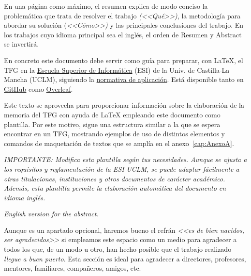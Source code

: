\pagestyle{plain}	%

\begin{resumenPral}[spanish]
En una página como máximo, el resumen explica de modo conciso la problemática que trata de resolver el trabajo \emph{(<<Qué>>)}, la metodología para  abordar su solución (\emph{<<Cómo>>)} y las principales conclusiones del trabajo. En los trabajos cuyo idioma principal sea el inglés, el orden de \textsf{Resumen} y \textsf{Abstract} se invertirá. 

En concreto este documento debe servir como guía para preparar, con \LaTeX, el TFG en la \href{http://webpub.esi.uclm.es/}{Escuela Superior de Informática} (ESI) de la Univ. de Castilla-La Mancha (UCLM), siguiendo la \href{https://esi.uclm.es/index.php/grado-en-ingenieria-informatica/trabajos-fin-de-grado/}{normativa de aplicación}. Está disponible tanto en \href{https://github.com/JesusSalido/TFG_ESI_UCLM}{GitHub} como \href{https://www.overleaf.com/latex/templates/plantilla-de-tfg-escuela-superior-de-informatica-uclm/phjgscmfqtsw}{Overleaf}.

Este texto se aprovecha para proporcionar información sobre la elaboración de la memoria del TFG con ayuda de \LaTeX{} empleando este documento como plantilla. Por este motivo, sigue una estructura similar a la que se espera encontrar en un TFG, mostrando ejemplos de uso de distintos elementos y comandos de maquetación de textos que se amplía en el anexo~\ref{cap:AnexoA}.

\noindent\emph{IMPORTANTE: Modifica esta plantilla según tus necesidades. Aunque se ajusta a los requisitos y reglamentación de la ESI-UCLM, se puede adaptar fácilmente a otras titulaciones, instituciones y otros documentos de carácter académico. Además, esta plantilla permite la elaboración automática del documento en idioma inglés.}
\end{resumenPral}


\begin{resumenAlt}[english]
\emph{English version for the abstract.}
\end{resumenAlt}


Aunque es un apartado opcional, haremos bueno el refrán \emph{<<es de bien nacidos, ser agradecidos>>} si empleamos este espacio como un medio para agradecer a todos los que, de un modo u otro, han hecho posible que el trabajo realizado \emph{llegue a buen puerto}. Esta sección es ideal para agradecer a directores, profesores, mentores, familiares, compañeros, amigos, etc. 
 
